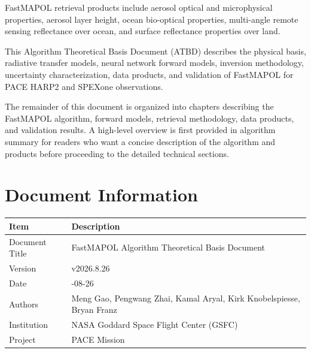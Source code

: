 \documentclass[
  letterpaper,
  open=any]{scrbook}
\begin{document}
FastMAPOL retrieval products include aerosol optical and microphysical
properties, aerosol layer height, ocean bio-optical properties,
multi-angle remote sensing reflectance over ocean, and surface
reflectance properties over land.

This Algorithm Theoretical Basis Document (ATBD) describes the physical
basis, radiative transfer models, neural network forward models,
inversion methodology, uncertainty characterization, data products, and
validation of FastMAPOL for PACE HARP2 and SPEXone observations.

The remainder of this document is organized into chapters describing the
FastMAPOL algorithm, forward models, retrieval methodology, data
products, and validation results. A high-level overview is first
provided in algorithm summary for readers who want a concise description
of the algorithm and products before proceeding to the detailed
technical sections.


\chapter{Document Information}\label{document-information}

\begin{longtable}[]{@{}
  >{\raggedright\arraybackslash}p{}
  >{\raggedright\arraybackslash}p{}@{}}
\toprule\noalign{}
\begin{minipage}[b]{\linewidth}\raggedright
Item
\end{minipage} & \begin{minipage}[b]{\linewidth}\raggedright
Description
\end{minipage} \\
\midrule\noalign{}
\endhead
\bottomrule\noalign{}
\endlastfoot
Document Title & FastMAPOL Algorithm Theoretical Basis Document \\
Version & v2026.8.26 \\
Date & 2026-08-26 \\
Authors & Meng Gao, Pengwang Zhai, Kamal Aryal, Kirk Knobelspiesse,
Bryan Franz \\
Institution & NASA Goddard Space Flight Center (GSFC) \\
Project & PACE Mission \\
\end{longtable}

\end{document}
